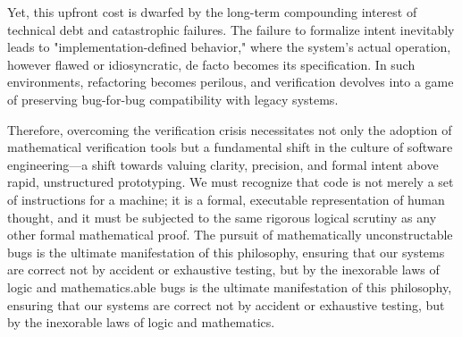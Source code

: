 Yet, this upfront cost is dwarfed by the long-term compounding interest of technical debt and catastrophic failures. The failure to formalize intent inevitably leads to "implementation-defined behavior," where the system's actual operation, however flawed or idiosyncratic, de facto becomes its specification. In such environments, refactoring becomes perilous, and verification devolves into a game of preserving bug-for-bug compatibility with legacy systems. 

Therefore, overcoming the verification crisis necessitates not only the adoption of mathematical verification tools but a fundamental shift in the culture of software engineering—a shift towards valuing clarity, precision, and formal intent above rapid, unstructured prototyping. We must recognize that code is not merely a set of instructions for a machine; it is a formal, executable representation of human thought, and it must be subjected to the same rigorous logical scrutiny as any other formal mathematical proof. The pursuit of mathematically unconstructable bugs is the ultimate manifestation of this philosophy, ensuring that our systems are correct not by accident or exhaustive testing, but by the inexorable laws of logic and mathematics.able bugs is the ultimate manifestation of this philosophy, ensuring that our systems are correct not by accident or exhaustive testing, but by the inexorable laws of logic and mathematics.